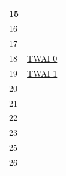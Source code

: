 \documentclass[main\_\_EN.tex]{subfiles}
\begin{document}
\begin{table}[H]
\begin{tabular}{|l|l|}
15                                  &       \nameref{mod:rmt}         \\ \hline
16                                  &       \nameref{mod:systimer}         \\ \hline
17                                  &       \nameref{mod:usbserialjtag}         \\ \hline
18                                  &       \hyperref[mod:twai]{TWAI 0}         \\ \hline
19                                  &       \hyperref[mod:twai]{TWAI 1}         \\ \hline
20                                  &       \nameref{mod:pcnt}         \\ \hline
21                                  &       \nameref{mod:mcpwm}         \\ \hline
22                                  &       \nameref{mod:evntaskmatrix}         \\ \hline
23                                  &       \nameref{mod:parlio}         \\ \hline
25                                  &       \nameref{mod:dbgassist}         \\ \hline
26                                  &       \nameref{mod:iomuxgpio}         \\ \hline
\end{tabular}
\end{table}
\end{document}
